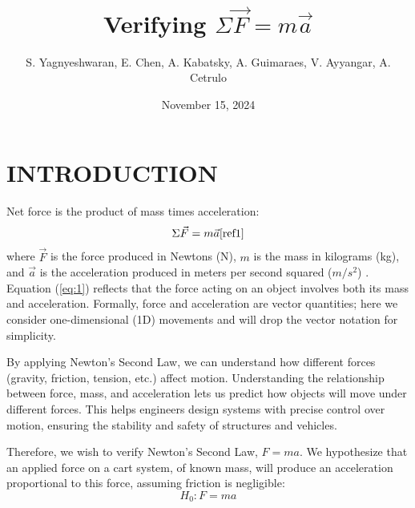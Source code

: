 \documentclass[twocolumn, 10pt]{article}
\title{\textbf{Verifying $\Sigma\vec{F} = m\vec{a}$}}
\author{
     S. Yagnyeshwaran, E. Chen, A. Kabatsky, A. Guimaraes, V. Ayyangar, A. Cetrulo
}
\date{November 15, 2024} %
\begin{document}

\section*{INTRODUCTION}
Net force is the product of mass times acceleration:
\begin{equation} \label{eq:1}
    \Sigma\vec{F} = m\vec{a} \cite{ref1}
\end{equation}
where $\vec{F}$ is the force produced in Newtons (N), $m$ is the mass in kilograms (kg), and $\vec{a}$ is the acceleration produced in meters per second squared ($m/s^2$) \cite{ref1}. Equation (\ref{eq:1}) reflects that the force acting on an object involves both its mass and acceleration. Formally, force and acceleration are vector quantities; here we consider one-dimensional (1D) movements and will drop the vector notation for simplicity. 

By applying Newton's Second Law, we can understand how different forces (gravity, friction, tension, etc.) affect motion. Understanding the relationship between force, mass, and acceleration lets us predict how objects will move under different forces. This helps engineers design systems with precise control over motion, ensuring the stability and safety of structures and vehicles.

Therefore, we wish to verify Newton's Second Law, $F = ma$. We hypothesize that an applied force on a cart system, of known mass, will produce an acceleration proportional to this force, assuming friction is negligible:
\begin{equation} \label{eq:2}
    H_0: F = ma 
\end{equation}
\end{document}
